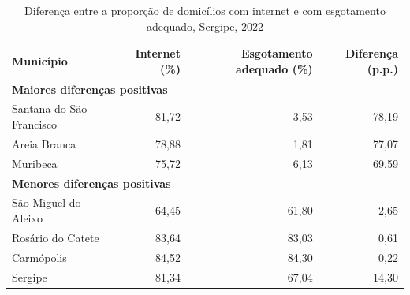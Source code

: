 \begin{table}[H]
\centering
\caption{Diferença entre a proporção de domicílios com internet e com esgotamento adequado, Sergipe, 2022}
\label{tab:item2-7-internet-esgoto}
\small
\begin{tabular}{lrrr}
\toprule
Município & Internet (\%) & Esgotamento adequado (\%) & Diferença (p.p.) \\
\midrule
\multicolumn{4}{l}{\textbf{Maiores diferenças positivas}} \\
Santana do São Francisco & 81,72 & 3,53 & 78,19 \\
Areia Branca & 78,88 & 1,81 & 77,07 \\
Muribeca & 75,72 & 6,13 & 69,59 \\
\midrule
\multicolumn{4}{l}{\textbf{Menores diferenças positivas}} \\
São Miguel do Aleixo & 64,45 & 61,80 & 2,65 \\
Rosário do Catete & 83,64 & 83,03 & 0,61 \\
Carmópolis & 84,52 & 84,30 & 0,22 \\
\midrule
Sergipe & 81,34 & 67,04 & 14,30 \\
\bottomrule
\end{tabular}
\end{table}
